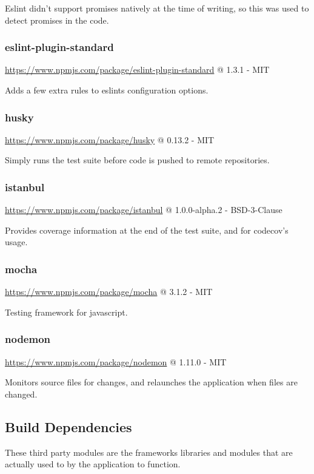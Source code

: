Eslint didn't support promises natively at the time of writing, so this was used to detect promises in the code.

\subsubsection*{eslint-plugin-standard} 

\url{https://www.npmjs.com/package/eslint-plugin-standard} @ 1.3.1 - MIT

Adds a few extra rules to eslints configuration options.

\subsubsection*{husky} 

\url{https://www.npmjs.com/package/husky} @ 0.13.2 - MIT

Simply runs the test suite before code is pushed to remote repositories.

\subsubsection*{istanbul} 

\url{https://www.npmjs.com/package/istanbul} @ 1.0.0-alpha.2 - BSD-3-Clause

Provides coverage information at the end of the test suite, and for codecov's usage.

\subsubsection*{mocha} 

\url{https://www.npmjs.com/package/mocha} @ 3.1.2 - MIT

Testing framework for javascript.

\subsubsection*{nodemon} 

\url{https://www.npmjs.com/package/nodemon} @ 1.11.0 - MIT

Monitors source files for changes, and relaunches the application when files are changed.

\subsection{Build Dependencies}
These third party modules are the frameworks libraries and modules that are actually used to by the application to function. 

